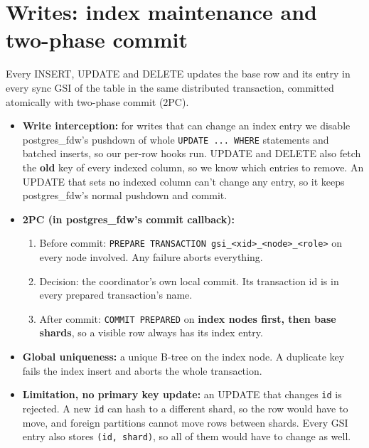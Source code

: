 \documentclass[11pt,a4paper]{article}
\begin{document}
\section{Writes: index maintenance and two-phase commit}
Every INSERT, UPDATE and DELETE updates the base row and its entry in every sync GSI of the table in the
same distributed transaction, committed atomically with two-phase commit (2PC).
\begin{itemize}
  \item \textbf{Write interception:} for writes that can change an index entry we disable postgres\_fdw's pushdown of whole \texttt{UPDATE ... WHERE}
        statements and batched inserts, so our per-row hooks run. UPDATE and DELETE also fetch the
        \textbf{old} key of every indexed column, so we know which entries to remove. An UPDATE that sets
        no indexed column can't change any entry, so it keeps postgres\_fdw's normal pushdown and commit.
  \item \textbf{2PC (in postgres\_fdw's commit callback):}
  \begin{enumerate}
    \item Before commit: \texttt{PREPARE TRANSACTION
          \textquotesingle{}gsi\_<xid>\_<node>\_<role>\textquotesingle{}} on every node involved. Any
          failure aborts everything.
    \item Decision: the coordinator's own local commit. Its transaction id is in every prepared
          transaction's name.
    \item After commit: \texttt{COMMIT PREPARED} on \textbf{index nodes first, then base shards}, so a
          visible row always has its index entry.
  \end{enumerate}
  \item \textbf{Global uniqueness:} a unique B-tree on the index node. A duplicate key fails the index
        insert and aborts the whole transaction.
  \item \textbf{Limitation, no primary key update:} an UPDATE that changes \texttt{id} is rejected.
        A new \texttt{id} can hash to a different shard, so the row would have to move, and foreign
        partitions cannot move rows between shards. Every GSI entry also stores \texttt{(id, shard)},
        so all of them would have to change as well.
\end{itemize}
\end{document}
